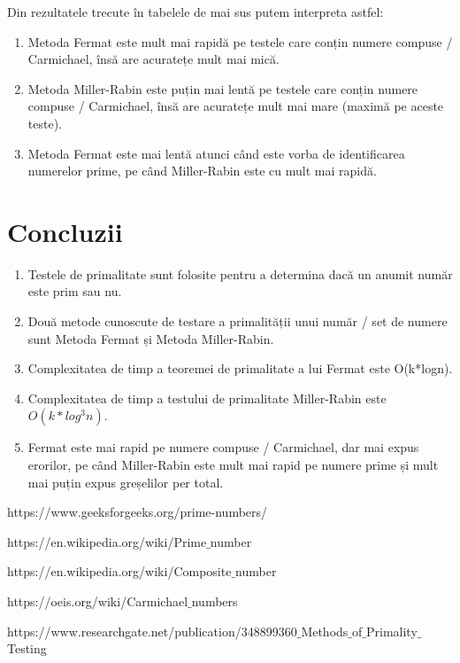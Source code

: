 \documentclass[runningheads]{llncs}
\begin{document}
Din rezultatele trecute în tabelele de mai sus putem interpreta astfel:

\begin{enumerate}
    \item Metoda Fermat este mult mai rapidă pe testele care conțin numere compuse / Carmichael, însă are acuratețe mult mai mică.
    \item Metoda Miller-Rabin este puțin mai lentă pe testele care conțin numere compuse / Carmichael, însă are acuratețe mult mai mare (maximă pe aceste teste).
    \item Metoda Fermat este mai lentă atunci când este vorba de identificarea numerelor prime, pe când Miller-Rabin este cu mult mai rapidă.
\end{enumerate}

\section{Concluzii}

\begin{enumerate}
    \item Testele de primalitate sunt folosite pentru a determina dacă un anumit număr este prim sau nu.
    \item Două metode cunoscute de testare a primalității unui număr / set de numere sunt Metoda Fermat și Metoda Miller-Rabin.
    \item Complexitatea de timp a teoremei de primalitate a lui Fermat este O(k*logn).
    \item Complexitatea de timp a testului de primalitate Miller-Rabin este $O(k*log^{3}n)$.
    \item Fermat este mai rapid pe numere compuse / Carmichael, dar mai expus erorilor, pe când Miller-Rabin este mult mai rapid pe numere prime și mult mai puțin expus greșelilor per total.
\end{enumerate}

\begin{thebibliography}{8}
https://www.geeksforgeeks.org/prime-numbers/

https://en.wikipedia.org/wiki/Prime$\_$number

https://en.wikipedia.org/wiki/Composite$\_$number

https://oeis.org/wiki/Carmichael$\_$numbers

https://www.researchgate.net/publication/348899360$\_$Methods$\_$of$\_$Primality$\_$Testing

\end{thebibliography}
\end{document}
